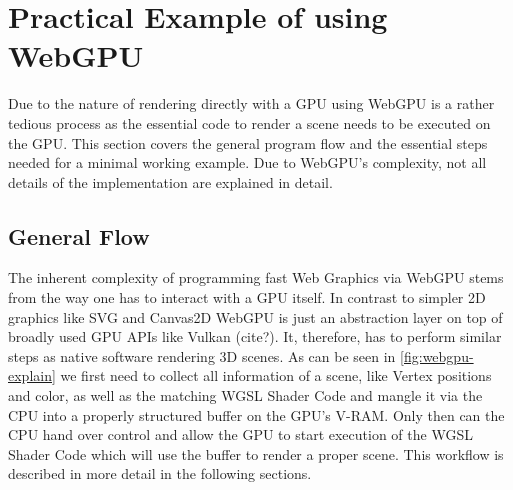 %
%
% 
% 

\newcommand*{\codesnippet}[4]{
  \inputminted[
    frame=lines,
    framesep=2mm,
    baselinestretch=1.2,
    linenos,
    fontsize=\scriptsize,
    firstline=#1,
    lastline=#2
  ]{#3}{#4}}


\newcommand*{\code}[1]{
  \inputminted[
    frame=lines,
    framesep=2mm,
    baselinestretch=1.2,
    linenos,
    fontsize=\scriptsize,
    breaklines=true,
    highlightlines={30-33,42-49}
  ]{typescript}{#1}}


\chapter{Practical Example of using WebGPU}

\label{chap:PracticalExample}

Due to the nature of rendering directly with a GPU using WebGPU is a rather tedious process as the essential code to render a scene needs to be executed on the GPU.
This section covers the general program flow and the essential steps needed for a minimal working example. Due to WebGPU's complexity, not all details of the implementation are explained in detail. 


\section{General Flow}

The inherent complexity of programming fast Web Graphics via WebGPU stems from the way one has to interact with a GPU itself.
In contrast to simpler 2D graphics like SVG and Canvas2D WebGPU is just an abstraction layer on top of broadly used GPU APIs like Vulkan (cite?).
It, therefore, has to perform similar steps as native software rendering 3D scenes. As can be seen in \ref*{fig:webgpu-explain} we first need to
collect all information of a scene, like Vertex positions and color, as well as the matching WGSL Shader Code and mangle it via the CPU into a properly structured
buffer on the GPU's V-RAM. Only then can the CPU hand over control and allow the GPU to start execution of the WGSL Shader Code which will use the buffer to render a proper scene.
This workflow is described in more detail in the following sections.


